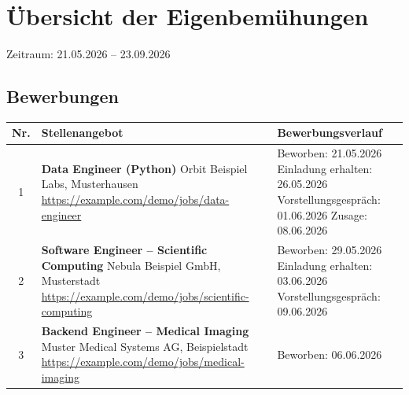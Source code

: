 \documentclass{article}
\begin{document}
\section*{Übersicht der Eigenbemühungen}
Zeitraum: 21.05.2026 -- 23.09.2026
\subsection*{Bewerbungen}
\begin{longtable}{|c|p{}|p{}|}
\hline
\textbf{Nr.} & \textbf{Stellenangebot} & \textbf{Bewerbungsverlauf} \\
\hline
\endhead
1 & \textbf{Data Engineer (Python)} \newline Orbit Beispiel Labs, Musterhausen \newline \url{https://example.com/demo/jobs/data-engineer} & Beworben: 21.05.2026 \newline Einladung erhalten: 26.05.2026 \newline Vorstellungsgespräch: 01.06.2026 \newline Zusage: 08.06.2026 \\
\hline
2 & \textbf{Software Engineer – Scientific Computing} \newline Nebula Beispiel GmbH, Musterstadt \newline \url{https://example.com/demo/jobs/scientific-computing} & Beworben: 29.05.2026 \newline Einladung erhalten: 03.06.2026 \newline Vorstellungsgespräch: 09.06.2026 \\
\hline
3 & \textbf{Backend Engineer – Medical Imaging} \newline Muster Medical Systems AG, Beispielstadt \newline \url{https://example.com/demo/jobs/medical-imaging} & Beworben: 06.06.2026 \\
\hline
\end{longtable}
\end{document}
